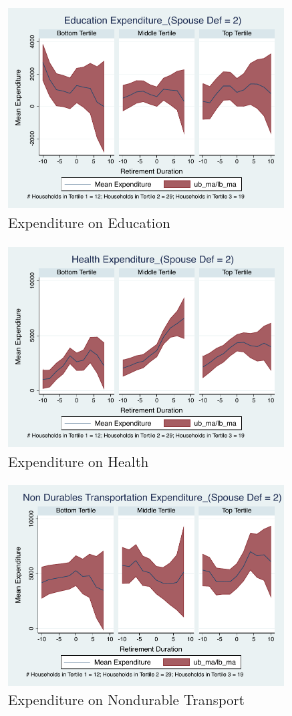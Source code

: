 \documentclass[11pt,onecolumn]{article}
\numberwithin{figure}{section}
\begin{document}
\begin{figure}[h]
	\caption{Expenditure on Education}
	\centering
	\includegraphics[width=0.65\textwidth]{../ConsumptionPostRetirement_by_SpouseDef_Cats/Smoothed/2/spouse_def_total_education_real.pdf}
\end{figure}
\clearpage

\begin{figure}[h]
	\caption{Expenditure on Health}
	\centering
	\includegraphics[width=0.65\textwidth]{../ConsumptionPostRetirement_by_SpouseDef_Cats/Smoothed/2/spouse_def_total_healthexpense_real.pdf}
\end{figure}


\begin{figure}[h]
	\caption{Expenditure on Nondurable Transport}
	\centering
	\includegraphics[width=0.65\textwidth]{../ConsumptionPostRetirement_by_SpouseDef_Cats/Smoothed/2/spouse_def_total_transport_real.pdf}
\end{figure}
\clearpage
\end{document}
